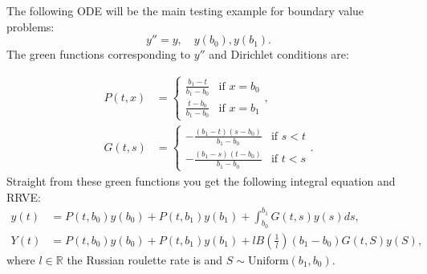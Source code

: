 \documentclass[a4paper,12pt]{article}
\begin{document}
\begin{example}[Dirichlet $y''=y$] \label{main dirichlet}
    The following ODE will be the main testing example for
    boundary value problems:
    \begin{equation} \label{eq:main dirichlet}
        y''=y, \quad y(b_{0}),y(b_{1}).
    \end{equation}
    The green functions corresponding to $y''$ and Dirichlet conditions are:

    \begin{align}
        P(t,x) & = \begin{cases}
                       \frac{b_{1}-t}{b_{1}-b_{0}} & \text{if } x = b_{0} \\
                       \frac{t-b_{0}}{b_{1}-b_{0}} & \text{if } x = b_{1}
                   \end{cases},       \\
        G(t,s) & = \begin{cases}
                       -\frac{(b_{1}-t)(s-b_{0})}{b_{1}-b_{0}} & \text{if } s<t \\
                       -\frac{(b_{1}-s)(t-b_{0})}{b_{1}-b_{0}} & \text{if } t<s
                   \end{cases}.
    \end{align}
    Straight from these green functions you get the following integral equation and RRVE:
    \begin{align} \label{inteq:main dirichlet}
        y(t) & = P(t,b_{0}) y(b_{0}) + P(t,b_{1}) y(b_{1}) +
        \int_{b_{0}}^{b_{1}} G(t,s)y(s) ds,                  \\
        Y(t) & = P(t,b_{0}) y(b_{0}) + P(t,b_{1}) y(b_{1})
        + l B\left(\frac{1}{l} \right)(b_{1}-b_{0}) G(t,S)y(S) , \label{RRVE:main dirichlet}
    \end{align}
    where $l \in \mathbb{R}$ the Russian roulette rate is and
    $S \sim \text{Uniform}(b_{1},b_{0})$.

\end{example}


\end{document}
